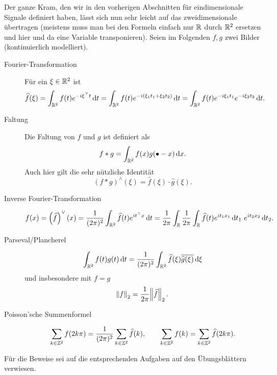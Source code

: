 \begin{remark}
Der ganze Kram, den wir in den vorherigen Abschnitten für eindimensionale Signale definiert haben,
lässt sich nun sehr leicht auf das zweidimensionale übertragen (meistens muss man bei den Formeln
einfach nur $ \mathbb{R} $ durch $ \mathbb{R}^{2} $ ersetzen und hier und da eine Variable transponieren). Seien im 
Folgenden $ f, g $ zwei Bilder (kontinuierlich modelliert).
\begin{description}
\item [Fourier-Transformation] 
  Für ein $ \xi \in \mathbb{R}^{2} $ ist
  \[
      \widehat{f}(\xi) 
    = \int_{\R^{2}} f(t) e^{-i \xi^{\top} t} \dif t
    = \int_{\R^{2}} f(t) e^{-i (\xi_{1}t_{1} + \xi_{2}t_{2})} \dif t
    = \int_{\R^{2}} f(t) e^{-i\xi_{1}t_{1}} e^{-i\xi_{2}t_{2}} \dif t.
  \]
\item [Faltung]
  Die Faltung von $ f $ und $ g $ ist definiert als
  \[
    f * g = \int_{\R^{2}} f(x) g(\bullet - x) \dif x.
  \]
  Auch hier gilt die sehr nützliche Identität
  \[
    (f * g)^{\wedge}(\xi) = \widehat{f}(\xi) \cdot \widehat{g}(\xi).
  \]
\item [Inverse Fourier-Transformation]
  \[
      f(x) 
    = \left( \widehat{f} \right)^{\vee}(x)
    = \frac{1}{(2\pi)^{2}} \int_{\R^{2}} \widehat{f}(t) e^{it^{\top}x} \dif t
    = \frac{1}{2\pi} \int_{\R} \frac{1}{2\pi} \int_{\R} 
        \widehat{f}(t) e^{it_{1}x_{1}} \dif t_{1} \ e^{it_{2}x_{2}} \dif t_{2}.
  \]
\item [Parseval/Plancherel]
\[
    \int_{\R^{2}} f(t)g(t) \dif t
  = \frac{1}{(2\pi)^{2}} \int_{\R^{2}} \widehat{f}(\xi) \overline{\widehat{g}(\xi)} \dif \xi
\]
und insbesondere mit $ f = g $
\[
  \norm{f}_{2} = \frac{1}{2\pi} \norm{\widehat{f}}_{2}.
\]
\item [Poisson'sche Summenformel]
\[
    \sum_{k \in \mathbb{Z}^{2}} f(2k\pi)
  = \frac{1}{(2\pi)^{2}} \sum_{k \in \mathbb{Z}^{2}} \widehat{f}(k), \qquad
    \sum_{k \in \mathbb{Z}^{2}} f(k)
  = \sum_{k \in \mathbb{Z}^{2}} \widehat{f}(2k\pi).
\]
\end{description}
Für die Beweise sei auf die entsprechenden Aufgaben auf den Übungsblättern verwiesen.
\end{remark}

